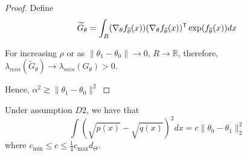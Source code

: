\begin{proof}
Define 
\[
\widetilde{G}_{\theta} =  \int_{R} ( \nabla_{\theta} f_{\overline{\theta}}(x) ) 
                                      ( \nabla_{\theta} f_{\overline{\theta}}(x) )^{\mathsf{T}}
                          \exp(f_{\overline{\theta}}(x)) dx
\]

For increasing $\rho$ or as $\| \theta_1 - \theta_0 \| \rightarrow 0$, $R \rightarrow \mathbb{R}$, therefore,
$\lambda_{min}(\tilde{G}_{\theta}) \rightarrow \lambda_{min}(G_{\theta}) > 0$. 

Hence, $\alpha^2 \gtrsim \| \theta_1 - \theta_0 \|^2$


\end{proof}




\begin{lemma}
\label{lem:hellinger_theta_equivalence}
Under assumption $D2$, we have that 
\[
\int (\sqrt{p(x)} - \sqrt{q(x)})^2 dx = c \| \theta_0 - \theta_1 \|_2^2
\]
where $ c_{\min} \leq c \leq \frac{1}{4} c_{\max} d_{\Theta} $.
\end{lemma}

